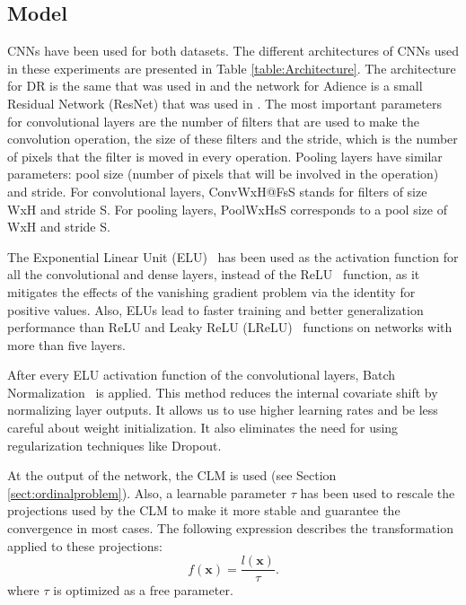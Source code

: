 \documentclass[journal]{IEEEtran}
\begin{document}
	\subsection{Model}
	\label{sect:model}
	CNNs have been used for both datasets. The different architectures of CNNs used in these experiments are presented in Table \ref{table:Architecture}. The architecture for DR is the same that was used in \cite{de2018weighted} and the network for Adience is a small Residual Network (ResNet) \cite{he2016deep} that was used in \cite{beckham2017unimodal}. The most important parameters for convolutional layers are the number of filters that are used to make the convolution operation, the size of these filters and the stride, which is the number of pixels that the filter is moved in every operation. Pooling layers have similar parameters: pool size (number of pixels that will be involved in the operation) and stride. For convolutional layers, ConvWxH@FsS stands for filters of size WxH and stride S. For pooling layers, PoolWxHsS corresponds to a pool size of WxH and stride S.
	
	The Exponential Linear Unit (ELU)~\cite{clevert2015fast} has been used as the activation function for all the convolutional and dense layers, instead of the ReLU~\cite{nair2010rectified} function, as it mitigates the effects of the vanishing gradient problem \cite{bengio1994learning,pascanu2013difficulty} via the identity for positive values. Also, ELUs lead to faster training and better generalization performance than ReLU and Leaky ReLU (LReLU)~\cite{maas2013rectifier} functions on networks with more than five layers.
	
	After every ELU activation function of the convolutional layers, Batch Normalization~\cite{ioffe2015batch} is applied. This method reduces the internal covariate shift by normalizing layer outputs. It allows us to use higher learning rates and be less careful about weight initialization. It also eliminates the need for using regularization techniques like Dropout.
	
	At the output of the network, the CLM is used (see Section \ref{sect:ordinalproblem}). Also, a learnable parameter $\tau$ has been used to rescale the projections used by the CLM to make it more stable and guarantee the convergence in most cases. The following expression describes the transformation applied to these projections:
	\begin{equation}
		\nonumber
		f(\mathbf{x}) = \frac{l(\mathbf{x})}{\tau}.
	\end{equation}
	where $\tau$ is optimized as a free parameter.
\end{document}
